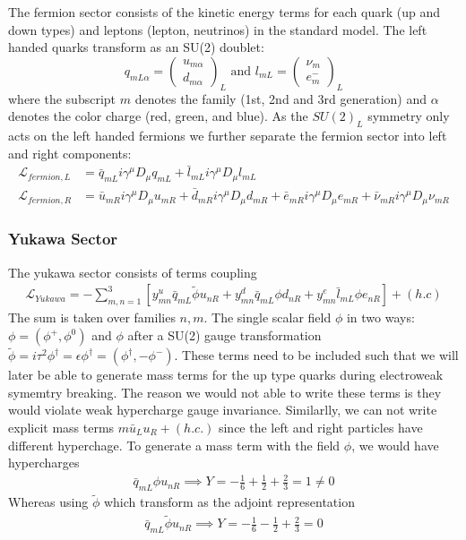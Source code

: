 The fermion sector consists of the kinetic energy terms for each quark (up and down types) and leptons (lepton, neutrinos) in the standard model.
The left handed quarks transform as an SU(2) doublet:
\begin{equation}
q_{mL\alpha} = \left( \begin{array}{c} u_{m\alpha}  \\ d_{m\alpha} \end{array} \right)_L \text{ and } l_{mL} = \left( \begin{array}{c} \nu_{m}  \\ e^{-}_{m} \end{array} \right)_L 
\end{equation}
where the subscript $m$ denotes the family (1st, 2nd and 3rd generation) and $\alpha$ denotes the color charge (red, green, and blue).
As the $SU(2)_L$ symmetry only acts on the left handed fermions we further separate the fermion sector into left and right components:
\begin{align*}
\mathcal{L}_{fermion,L} &= \bar{q}_{mL} i \gamma^\mu D_\mu q_{mL} + \bar{l}_{mL} i \gamma^\mu D_\mu l_{mL}\\
\mathcal{L}_{fermion,R} &=  \bar{u}_{mR} i \gamma^\mu D_\mu u_{mR} 
+ \bar{d}_{mR} i \gamma^\mu D_\mu d_{mR} + \bar{e}_{mR} i \gamma^\mu D_\mu e_{mR} + \bar{\nu}_{mR} i \gamma^\mu D_\mu \nu_{mR}
\end{align*}

\subsubsection{Yukawa Sector}

The yukawa sector consists of terms coupling 
\begin{align*}
\mathcal{L}_{Yukawa} = - \sum_{m,n=1}^3 \left [ y^u_{mn} \bar{q}_{mL} \tilde{\phi} u_{nR} + y^d_{mn} \bar{q}_{mL} \phi d_{nR}  + y_{mn}^e \bar{l}_{mL} \phi  e_{nR}  \right ] + (h.c) 
\end{align*}
The sum is taken over families $n,m$. The single scalar field $\phi$ in two ways: $\phi = ( \phi^+ , \phi^0)$ and $\phi$ after
a SU(2) gauge transformation $\tilde{\phi} = i \tau^2 \phi^\dagger = \epsilon \phi^\dagger = 
(\phi^\dagger , -\phi^-)$. These terms need to be included such that we will
 later be able to generate mass terms for the up type quarks during electroweak symemtry breaking. The reason
we would not able to write these terms is they would violate weak hypercharge gauge invariance.  Similarlly, 
we can not write explicit mass terms $m\bar{u}_L u_R + (h.c.)$ since the left and right particles have
different hyperchage. To generate a mass term with the field $\phi$, we would have hypercharges
\begin{align*}
\bar{q}_{mL} \phi u_{nR} \implies Y= -\frac{1}{6} + \frac{1}{2} + \frac{2}{3} = 1 \neq 0
\end{align*}
Whereas using $\tilde{\phi}$ which transform as the adjoint representation
\begin{align*}
\bar{q}_{mL} \tilde{\phi} u_{nR} \implies Y= -\frac{1}{6} - \frac{1}{2} + \frac{2}{3} = 0
\end{align*}

